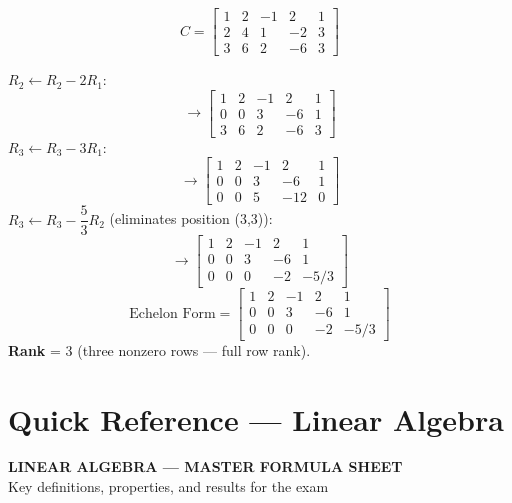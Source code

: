 \documentclass[12pt]{article}
\begin{document}
\[
  C = \begin{bmatrix}1&2&-1&2&1\\2&4&1&-2&3\\3&6&2&-6&3\end{bmatrix}
\]

\begin{solbox}

$R_2 \leftarrow R_2 - 2R_1$:
\[
  \to \begin{bmatrix}1&2&-1&2&1\\0&0&3&-6&1\\3&6&2&-6&3\end{bmatrix}
\]
$R_3 \leftarrow R_3 - 3R_1$:
\[
  \to \begin{bmatrix}1&2&-1&2&1\\0&0&3&-6&1\\0&0&5&-12&0\end{bmatrix}
\]
$R_3 \leftarrow R_3 - \dfrac{5}{3}R_2$ \quad (eliminates position (3,3)):
\[
  \to \begin{bmatrix}1&2&-1&2&1\\0&0&3&-6&1\\0&0&0&-2&-5/3\end{bmatrix}
\]
\[
  \boxed{
    \text{Echelon Form} = \begin{bmatrix}1&2&-1&2&1\\0&0&3&-6&1\\0&0&0&-2&-5/3\end{bmatrix}
  }
\]
\textbf{Rank} = 3 \quad (three nonzero rows — full row rank).
\end{solbox}

\section{Quick Reference — Linear Algebra}

\begin{tcolorbox}[enhanced, arc=0pt, boxrule=0pt,
  colback=primary, colframe=primary,
  left=14pt, right=14pt, top=10pt, bottom=10pt,
  borderline south={3pt}{0pt}{accent}]
  \centering
  {\large\bfseries\color{white} LINEAR ALGEBRA — MASTER FORMULA SHEET}\\[4pt]
  {\small\color{lightbg} Key definitions, properties, and results for the exam}
\end{tcolorbox}

\vspace{10pt}
\end{document}
